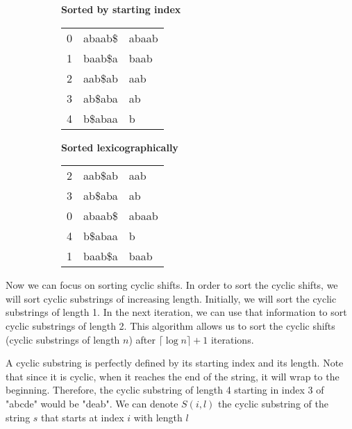 \begin{figure}[h!]
		\centering
		\begin{subfigure}[]{0.45\textwidth}
		\begin{center}
				\textbf{\footnotesize Sorted by starting index}
				\vspace{7pt}

				\ttfamily
		\begin{tabular}{rll}
				0 & abaab\$ & abaab\\
				1 & baab\$a &baab\\
				2 & aab\$ab & aab\\
				3 & ab\$aba & ab\\
				4 & b\$abaa &b\\
		\end{tabular}
				
		\end{center}
		\end{subfigure}
		\begin{subfigure}[]{0.45\textwidth}
		\begin{center}
				\textbf{\footnotesize Sorted lexicographically}
				\vspace{7pt}

				\ttfamily
		\begin{tabular}{rll}
				2 & aab\$ab &aab \\
				3 & ab\$aba & ab\\
				0 & abaab\$ & abaab\\
				4 & b\$abaa & b\\
				1 & baab\$a &baab\\
		\end{tabular}
				
		\end{center}
		\end{subfigure}

\end{figure}
Now we can focus on sorting cyclic shifts.
In order to sort the cyclic shifts, we will sort cyclic
substrings of increasing length. Initially, we will
sort the cyclic substrings of length 1. In the next
iteration, we can use that information to sort 
cyclic substrings of length 2. This algorithm allows
us to sort the cyclic shifts (cyclic substrings of
length $n$) after $\lceil \log n \rceil+1$ iterations.

A cyclic substring is perfectly defined by its starting
index and its length. Note that since it is cyclic,
when it reaches the end of the string, it will wrap
to the beginning. Therefore, the cyclic substring of 
length 4 starting in index 3 of "abcde" would be "deab".
We can denote $S(i,l)$ the cyclic substring of the
string $s$ that starts at index $i$ with length $l$


